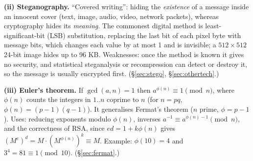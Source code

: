 \textbf{(ii) Steganography.} ``Covered writing'': hiding the \emph{existence} of a message inside an innocent cover (text, image, audio, video, network packets), whereas cryptography hides its \emph{meaning}. The commonest digital method is least-significant-bit (LSB) substitution, replacing the last bit of each pixel byte with message bits, which changes each value by at most 1 and is invisible; a $512 \times 512$ 24-bit image hides up to 96 KB. Weaknesses: once the method is known it gives no security, and statistical steganalysis or recompression can detect or destroy it, so the message is usually encrypted first. (\S\ref{sec:stego}, \S\ref{sec:othertech}.)

\textbf{(iii) Euler's theorem.} If $\gcd(a, n) = 1$ then $a^{\phi(n)} \equiv 1 \pmod n$, where $\phi(n)$ counts the integers in $1..n$ coprime to $n$ (for $n = pq$, $\phi(n) = (p-1)(q-1)$). It generalises Fermat's theorem ($n$ prime, $\phi = p - 1$). Uses: reducing exponents modulo $\phi(n)$, inverses $a^{-1} \equiv a^{\phi(n)-1} \pmod n$, and the correctness of RSA, since $ed = 1 + k\phi(n)$ gives $(M^e)^d = M \cdot (M^{\phi(n)})^k \equiv M$. Example: $\phi(10) = 4$ and $3^4 = 81 \equiv 1 \pmod{10}$. (\S\ref{sec:fermat}.)
